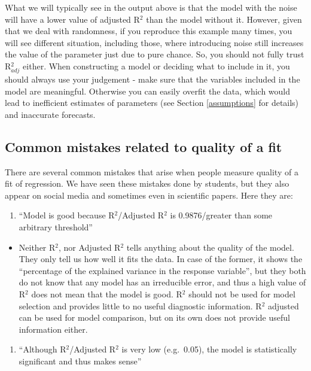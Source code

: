 \documentclass[
]{book}
\providecommand{\tightlist}{%
  \setlength{\itemsep}{0pt}\setlength{\parskip}{0pt}}
\theoremstyle{definition}
\theoremstyle{definition}
\theoremstyle{definition}
\theoremstyle{definition}
\theoremstyle{remark}
\begin{document}
What we will typically see in the output above is that the model with the noise will have a lower value of adjusted R\(^2\) than the model without it. However, given that we deal with randomness, if you reproduce this example many times, you will see different situation, including those, where introducing noise still increases the value of the parameter just due to pure chance. So, you should not fully trust R\(^2_{adj}\) either. When constructing a model or deciding what to include in it, you should always use your judgement - make sure that the variables included in the model are meaningful. Otherwise you can easily overfit the data, which would lead to inefficient estimates of parameters (see Section \ref{assumptions} for details) and inaccurate forecasts.

\subsection{Common mistakes related to quality of a fit}\label{common-mistakes-related-to-quality-of-a-fit}

There are several common mistakes that arise when people measure quality of a fit of regression. We have seen these mistakes done by students, but they also appear on social media and sometimes even in scientific papers. Here they are:

\begin{enumerate}
\def\labelenumi{\arabic{enumi}.}
\tightlist
\item
  ``Model is good because R\(^2\)/Adjusted R\(^2\) is 0.9876/greater than some arbitrary threshold''
\end{enumerate}

\begin{itemize}
\tightlist
\item
  Neither R\(^2\), nor Adjusted R\(^2\) tells anything about the quality of the model. They only tell us how well it fits the data. In case of the former, it shows the ``percentage of the explained variance in the response variable'', but they both do not know that any model has an irreducible error, and thus a high value of R\(^2\) does not mean that the model is good. R\(^2\) should not be used for model selection and provides little to no useful diagnostic information. R\(^2\) adjusted can be used for model comparison, but on its own does not provide useful information either.
\end{itemize}

\begin{enumerate}
\def\labelenumi{\arabic{enumi}.}
\setcounter{enumi}{1}
\tightlist
\item
  ``Although R\(^2\)/Adjusted R\(^2\) is very low (e.g.~0.05), the model is statistically significant and thus makes sense''
\end{enumerate}
\end{document}

